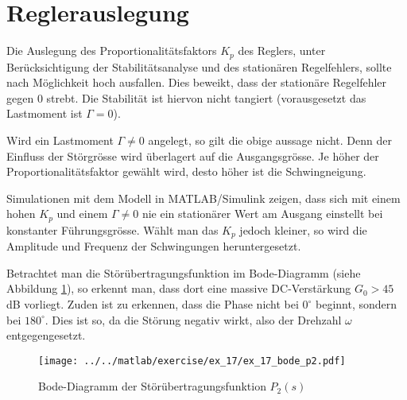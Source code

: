 \section{Reglerauslegung}
Die Auslegung des Proportionalitätsfaktors $K_p$ des Reglers, unter
Berücksichtigung der Stabilitätsanalyse und des stationären Regelfehlers,
sollte nach Möglichkeit hoch ausfallen. Dies beweikt, dass der stationäre
Regelfehler gegen 0 strebt. Die Stabilität ist hiervon nicht tangiert
(vorausgesetzt das Lastmoment ist $\Gamma = 0$).

Wird ein Lastmoment $\Gamma \neq 0$ angelegt, so gilt die obige aussage
nicht. Denn der Einfluss der Störgrösse wird überlagert auf die
Ausgangsgrösse. Je höher der Proportionalitätsfaktor gewählt wird, desto
höher ist die Schwingneigung. 

Simulationen mit dem Modell in MATLAB/Simulink zeigen, dass sich mit einem
hohen $K_p$ und einem $\Gamma \neq 0$ nie ein stationärer Wert am Ausgang
einstellt bei konstanter Führungsgrösse. Wählt man das $K_p$ jedoch kleiner,
so wird die Amplitude und Frequenz der Schwingungen heruntergesetzt.

Betrachtet man die Störübertragungsfunktion im Bode-Diagramm (siehe Abbildung
\ref{fig:ex_17_bode_p2}), so erkennt man, dass dort eine massive
DC-Verstärkung $G_0 > 45$dB vorliegt. Zuden ist zu erkennen, dass die
Phase nicht bei $0^{\circ}$ beginnt, sondern bei $180^{\circ}$. Dies ist so,
da die Störung negativ wirkt, also der Drehzahl $\omega$ entgegengesetzt.

\begin{figure}[h!]
	\centering
	\texttt{[image: ../../matlab/exercise/ex\_17/ex\_17\_bode\_p2.pdf]}
	\caption{Bode-Diagramm der Störübertragungsfunktion $P_2(s)$}
	\label{fig:ex_17_bode_p2}
\end{figure}
